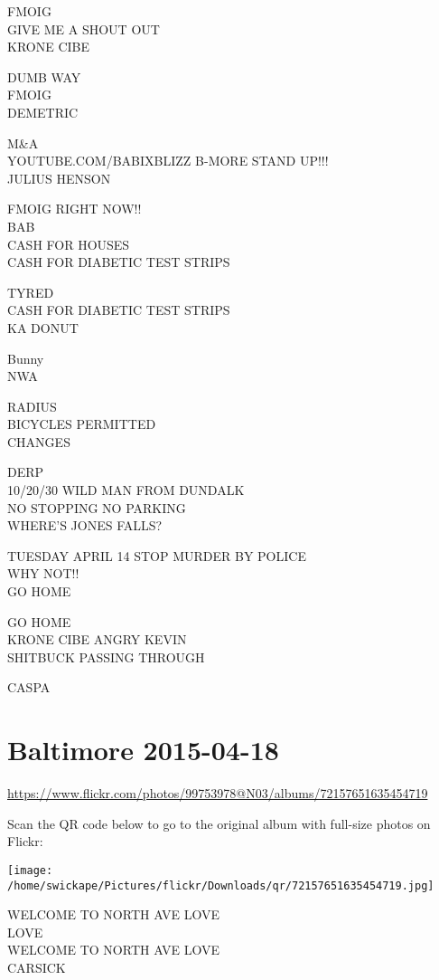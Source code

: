 \documentclass[10pt,letterpaper]{article}
\begin{document}
FMOIG\\
GIVE ME A SHOUT OUT\\
KRONE CIBE

DUMB WAY\\
FMOIG\\
DEMETRIC

M\&A\\
YOUTUBE.COM/BABIXBLIZZ B{-}MORE STAND UP!!!\\
JULIUS HENSON

FMOIG RIGHT NOW!!\\
BAB\\
CASH FOR HOUSES\\
CASH FOR DIABETIC TEST STRIPS

TYRED\\
CASH FOR DIABETIC TEST STRIPS\\
KA DONUT

Bunny\\
NWA

RADIUS\\
BICYCLES PERMITTED\\
CHANGES

DERP\\
10/20/30 WILD MAN FROM DUNDALK\\
NO STOPPING NO PARKING\\
WHERE'S JONES FALLS?

TUESDAY APRIL 14 STOP MURDER BY POLICE\\
WHY NOT!!\\
GO HOME

GO HOME\\
KRONE CIBE ANGRY KEVIN\\
SHITBUCK PASSING THROUGH

CASPA


\section*{Baltimore 2015-04-18}

\url{https://www.flickr.com/photos/99753978@N03/albums/72157651635454719}

Scan the QR code below to go to the original album with full-size photos on Flickr:

\texttt{[image: /home/swickape/Pictures/flickr/Downloads/qr/72157651635454719.jpg]}


WELCOME TO NORTH AVE LOVE\\
LOVE\\
WELCOME TO NORTH AVE LOVE\\
CARSICK
\end{document}
